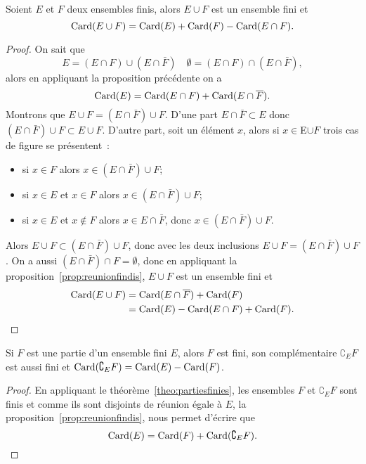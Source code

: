   \begin{prop}
    Soient $E$ et $F$ deux ensembles finis, alors $E\cup F$ est un ensemble fini et
    \begin{equation}
    \operatorname{Card}(E\cup F)=\operatorname{Card}(E)+\operatorname{Card}(F)-\operatorname{Card}(E\cap F).
  \end{equation}
\end{prop}
\begin{proof}
  On sait que 
  \begin{equation}
    E=(E\cap F)\cup (E\cap \bar{F}) \quad \emptyset=(E\cap F)\cap (E\cap \bar{F}),
  \end{equation} 
  alors en appliquant la proposition précédente on a
  \begin{equation}
    \operatorname{Card}(E)=\operatorname{Card}(E\cap F)+\operatorname{Card}(E\cap \overline{F}).
  \end{equation}
  Montrons que $E\cup F =(E\cap \bar{F}) \cup F$. D'une part $E \cap \bar{F} \subset E$ donc $(E\cap \bar{F}) \cup F \subset E\cup F$. D'autre part, soit un élément $x$, alors si $x \in $E$ \cup F$ trois cas de figure se présentent~:
  \begin{itemize}
  \item si $x\in F$ alors $x \in (E\cap \bar{F}) \cup F$;
  \item si $x \in E$ et $x \in F$ alors $x \in (E\cap \bar{F}) \cup F$;
  \item si $x \in E$ et $x \notin F$ alors $x \in E\cap \bar{F}$, donc $x \in (E\cap \bar{F}) \cup F$.
  \end{itemize}
  Alors $E\cup F \subset (E \cap \bar{F})\cup F$, donc avec les deux inclusions $E\cup F =(E\cap \bar{F}) \cup F$. On a aussi $(E\cap \bar{F})\cap F=\emptyset$, donc en appliquant la proposition~\ref{prop:reunionfindis}, $E\cup F$ est un ensemble fini et
  \begin{align}
    \operatorname{Card}(E\cup F)&=\operatorname{Card}(E\cap \overline{F})+\operatorname{Card}(F)\\ &=\operatorname{Card}(E) - \operatorname{Card}(E\cap F)+\operatorname{Card}(F).
  \end{align}
\end{proof}
\begin{prop}
  Si $F$ est une partie d'un ensemble fini $E$, alors $F$ est fini, son complémentaire $\complement_E F$ est aussi fini et $\operatorname{Card}(\complement_E F)=\operatorname{Card}(E)-\operatorname{Card}(F)$.
\end{prop}
\begin{proof}
  En appliquant le théorème~\ref{theo:partiesfinies}, les ensembles $F$ et $\complement_E F$ sont finis et comme ils sont disjoints de réunion égale à $E$, la proposition~\ref{prop:reunionfindis}, nous permet d'écrire que
  \begin{equation}
    \operatorname{Card}(E)=\operatorname{Card}(F)+\operatorname{Card}(\complement_E F).
  \end{equation}
\end{proof}
